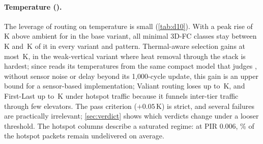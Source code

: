 \begin{table}[tbp]
\centering
\caption{Energy per delivered flit relative to the reference (): minimum, median and maximum over 27 parameter combinations (uniform traffic, PIR 0.006, five seeds).}
\label{tab:d9}
\small

\end{table}

\paragraph{Temperature ().} The leverage of routing on temperature is small (\cref{tab:d10}). With a peak rise of \,K above ambient for  in the base variant, all minimal 3D-FC classes stay between \,K and \,K of it in every variant and pattern. Thermal-aware selection gains at most \,K, in the weak-vertical variant where heat removal through the stack is hardest; since  reads its temperatures from the same compact model that judges , without sensor noise or delay beyond its 1,000-cycle update, this gain is an upper bound for a sensor-based implementation; Valiant routing loses up to \,K, and First-Last up to \,K under hotspot traffic because it funnels inter-tier traffic through few elevators. The pass criterion ($+0.05$\,K) is strict, and several failures are practically irrelevant; \cref{sec:verdict} shows which verdicts change under a looser threshold. The hotspot columns describe a saturated regime: at PIR 0.006, \% of the hotspot packets remain undelivered on average.

\begin{table}[tbp]
\centering
\caption{Peak temperature rise relative to the reference (K, ), compact steady-state model, PIR 0.006. Variants: base; NoC-heavy (lower core power, higher energy per flit); weak vertical conduction; strong lateral spreading.}
\label{tab:d10}
\scriptsize
\setlength{\tabcolsep}{3.5pt}

\end{table}

